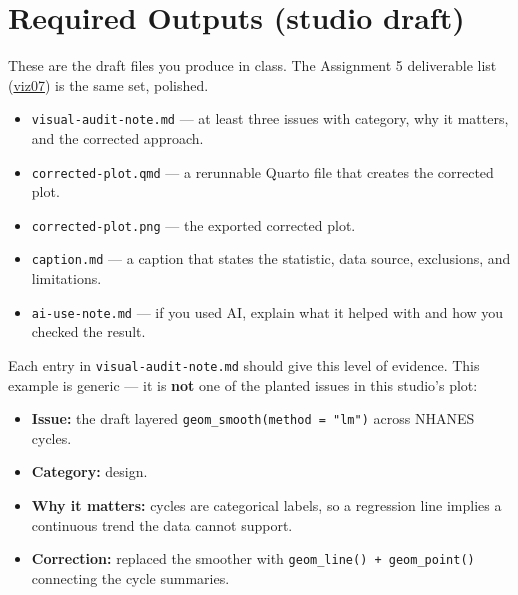 \documentclass[
  letterpaper,
  DIV=11,
  numbers=noendperiod,
  oneside]{scrreprt}
\providecommand{\tightlist}{%
  \setlength{\itemsep}{0pt}\setlength{\parskip}{0pt}}
\begin{document}
\section*{Required Outputs (studio
draft)}\label{required-outputs-studio-draft}


These are the draft files you produce in class. The Assignment 5
deliverable list (\href{viz07-assignment-a5-and-reference.qmd}{viz07})
is the same set, polished.

\begin{itemize}
\tightlist
\item
  \texttt{visual-audit-note.md} --- at least three issues with category,
  why it matters, and the corrected approach.
\item
  \texttt{corrected-plot.qmd} --- a rerunnable Quarto file that creates
  the corrected plot.
\item
  \texttt{corrected-plot.png} --- the exported corrected plot.
\item
  \texttt{caption.md} --- a caption that states the statistic, data
  source, exclusions, and limitations.
\item
  \texttt{ai-use-note.md} --- if you used AI, explain what it helped
  with and how you checked the result.
\end{itemize}

\begin{tcolorbox}[enhanced jigsaw, title=\textcolor{quarto-callout-tip-color}{\faLightbulb}\hspace{0.5em}{What a strong audit-note entry looks like}, arc=.35mm, toptitle=1mm, colframe=quarto-callout-tip-color-frame, toprule=.15mm, leftrule=.75mm, bottomtitle=1mm, opacityback=0, bottomrule=.15mm, coltitle=black, breakable, opacitybacktitle=0.6, titlerule=0mm, colback=white, left=2mm, colbacktitle=quarto-callout-tip-color!10!white, rightrule=.15mm]

Each entry in \texttt{visual-audit-note.md} should give this level of
evidence. This example is generic --- it is \textbf{not} one of the
planted issues in this studio's plot:

\begin{itemize}
\tightlist
\item
  \textbf{Issue:} the draft layered
  \texttt{geom\_smooth(method\ =\ "lm")} across NHANES cycles.
\item
  \textbf{Category:} design.
\item
  \textbf{Why it matters:} cycles are categorical labels, so a
  regression line implies a continuous trend the data cannot support.
\item
  \textbf{Correction:} replaced the smoother with
  \texttt{geom\_line()\ +\ geom\_point()} connecting the cycle
  summaries.
\end{itemize}

\end{tcolorbox}
\end{document}
